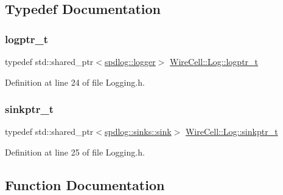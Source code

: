 \subsection{Typedef Documentation}
\mbox{\label{namespace_wire_cell_1_1_log_a5147137d4bcdf4d35c235c5c1ec1495f}} 
\subsubsection{\texorpdfstring{logptr\+\_\+t}{logptr\_t}}
{\footnotesize\ttfamily typedef std\+::shared\+\_\+ptr$<$\hyperlink{classspdlog_1_1logger}{spdlog\+::logger}$>$ \hyperlink{namespace_wire_cell_1_1_log_a5147137d4bcdf4d35c235c5c1ec1495f}{Wire\+Cell\+::\+Log\+::logptr\+\_\+t}}



Definition at line 24 of file Logging.\+h.

\mbox{\label{namespace_wire_cell_1_1_log_abee3220a6c332928df3d1583550c6e22}} 
\subsubsection{\texorpdfstring{sinkptr\+\_\+t}{sinkptr\_t}}
{\footnotesize\ttfamily typedef std\+::shared\+\_\+ptr$<$\hyperlink{classspdlog_1_1sinks_1_1sink}{spdlog\+::sinks\+::sink}$>$ \hyperlink{namespace_wire_cell_1_1_log_abee3220a6c332928df3d1583550c6e22}{Wire\+Cell\+::\+Log\+::sinkptr\+\_\+t}}



Definition at line 25 of file Logging.\+h.



\subsection{Function Documentation}
\mbox{\label{namespace_wire_cell_1_1_log_a2b30e7b1375fa3fdb23be092fe116cfb}} 
